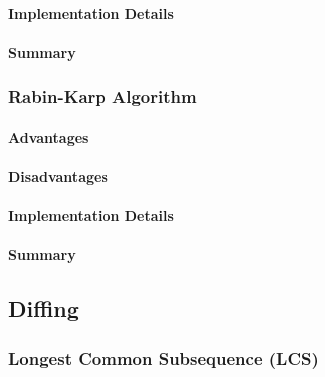 \paragraph{Implementation Details}

\paragraph{Summary}


\subsubsection{Rabin-Karp Algorithm}

\paragraph{Advantages}
\paragraph{Disadvantages}

\paragraph{Implementation Details}

\paragraph{Summary}



\subsection{Diffing}


\subsubsection{Longest Common Subsequence (LCS)}

